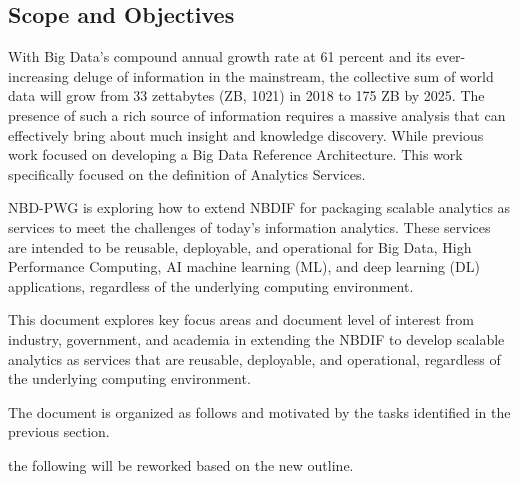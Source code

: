 \subsection{Scope and Objectives}

With Big Data’s compound annual growth rate at 61 percent and its ever-increasing deluge of information in the mainstream, the collective sum of world data will grow from 33 zettabytes (ZB, 1021) in 2018 to 175 ZB by 2025. The presence of such a rich source of information requires a massive analysis that can effectively bring about much insight and knowledge discovery. While previous work focused on developing a Big Data Reference Architecture. This work specifically focused on the definition of Analytics Services.

NBD-PWG is exploring how to extend NBDIF for packaging scalable analytics as services to meet the challenges of today’s information analytics. These services are intended to be reusable, deployable, and operational for Big Data, High Performance Computing, AI machine learning (ML), and deep learning (DL) applications, regardless of the underlying computing environment.

This document explores key focus areas and document level of interest from industry, government, and academia in extending the NBDIF to develop scalable analytics as services that are reusable, deployable, and operational, regardless of the underlying computing environment. 

The document is organized as follows and motivated by the tasks identified in the previous section.

 the following will be reworked based on the new outline.

